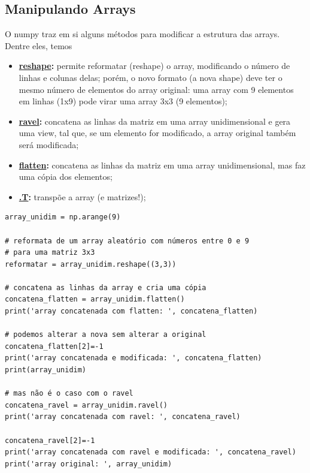 \documentclass[../numerical_methods.tex]{subfiles}
\begin{document}
\subsection{Manipulando Arrays}
O numpy traz em si alguns métodos para modificar a estrutura das arrays. Dentre eles, temos
\begin{itemize}
	\item \textbf{\underline{reshape}:} permite reformatar (reshape) o array, modificando o número de linhas e colunas delas; porém, o novo formato (a nova shape) deve ter o mesmo número de elementos do array original: uma array com 9 elementos em linhas (1x9) pode virar uma array 3x3 (9 elementos);
	\item \textbf{\underline{ravel}:} concatena as linhas da matriz em uma array unidimensional e gera uma view, tal que, se um elemento for modificado, a array original também será modificada;
	\item \textbf{\underline{flatten}:} concatena as linhas da matriz em uma array unidimensional, mas faz uma cópia dos elementos;
	\item \textbf{\underline{.T}:} transpõe a array (e matrizes!);
\end{itemize}

\begin{verbatim}
array_unidim = np.arange(9)

# reformata de um array aleatório com números entre 0 e 9 
# para uma matriz 3x3
reformatar = array_unidim.reshape((3,3))

# concatena as linhas da array e cria uma cópia 
concatena_flatten = array_unidim.flatten()
print('array concatenada com flatten: ', concatena_flatten)

# podemos alterar a nova sem alterar a original
concatena_flatten[2]=-1
print('array concatenada e modificada: ', concatena_flatten)
print(array_unidim)

# mas não é o caso com o ravel
concatena_ravel = array_unidim.ravel()
print('array concatenada com ravel: ', concatena_ravel)

concatena_ravel[2]=-1 
print('array concatenada com ravel e modificada: ', concatena_ravel)
print('array original: ', array_unidim)
\end{verbatim}
\end{document}
